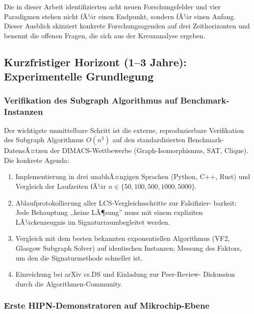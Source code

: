 ﻿\documentclass[a4paper,12pt]{scrreprt}
\theoremstyle{definition}
\begin{document}
Die in dieser Arbeit identifizierten acht neuen Forschungsfelder und vier
Paradigmen stehen nicht fÃ¼r einen Endpunkt, sondern fÃ¼r einen Anfang.
Dieser Ausblick skizziert konkrete Forschungsagenden auf drei Zeithorizonten
und benennt die offenen Fragen, die sich aus der Kreuzanalyse ergeben.

\subsection{Kurzfristiger Horizont (1--3 Jahre): Experimentelle Grundlegung}

\subsubsection{Verifikation des Subgraph Algorithmus auf Benchmark-Instanzen}

Der wichtigste unmittelbare Schritt ist die externe, reproduzierbare
Verifikation des Subgraph Algorithmus $O(n^3)$ auf den standardisierten
Benchmark-DatensÃ¤tzen der DIMACS-Wettbewerbe (Graph-Isomorphismus, SAT,
Clique). Die konkrete Agenda:
\begin{enumerate}
  \item Implementierung in drei unabhÃ¤ngigen Sprachen (Python, C++, Rust)
    und Vergleich der Laufzeiten fÃ¼r $n \in \{50, 100, 500, 1000, 5000\}$.
  \item Ablaufprotokollierung aller LCS-Vergleichsschritte zur Falsifizier-
    barkeit: Jede Behauptung ,,keine LÃ¶sung'' muss mit einem expliziten
    LÃ¼ckenzeugnis im Signaturraumbegleitet werden.
  \item Vergleich mit dem besten bekannten exponentiellen Algorithmus
    (VF2, Glasgow Subgraph Solver) auf identischen Instanzen; Messung
    des Faktors, um den die Signaturmethode schneller ist.
  \item Einreichung bei arXiv cs.DS und Einladung zur Peer-Review-
    Diskussion durch die Algorithmen-Community.
\end{enumerate}

\subsubsection{Erste HIPN-Demonstratoren auf Mikrochip-Ebene}
\end{document}
